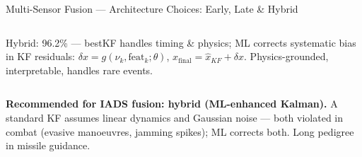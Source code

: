 \documentclass[aspectratio=169,10pt,t]{beamer}
\begin{document}
\begin{frame}{Multi-Sensor Fusion --- Architecture Choices: Early, Late \& Hybrid}
\begin{columns}[T]
\begin{cbox}[ISSAgrn]{Hybrid: 96.2\% --- best}\scriptsize KF handles timing \& physics; ML corrects systematic bias in KF residuals: $\delta x=g(\nu_k,\text{feat}_k;\theta)$, $\hat x_{\text{final}}=\hat x_{KF}+\delta x$. Physics-grounded, interpretable, handles rare events.\end{cbox}
\end{columns}
\begin{ibox}\scriptsize\textbf{Recommended for IADS fusion: hybrid (ML-enhanced Kalman).} A standard KF assumes linear dynamics and Gaussian noise --- both violated in combat (evasive manoeuvres, jamming spikes); ML corrects both. Long pedigree in missile guidance.\end{ibox}
\end{frame}
\end{document}

